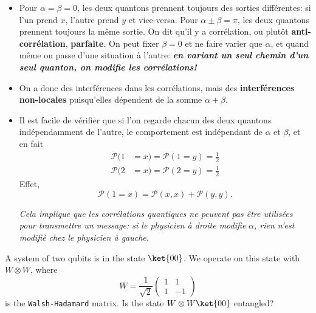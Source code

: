 \begin{itemize}
\item Pour $\alpha=\beta=0$, les deux quantons prennent toujours des sorties
différentes: si l'un prend $x$, l'autre prend $y$ et vice-versa. Pour
$\alpha\pm\beta=\pi$, les deux quantons prennent toujours la même
sortie. On dit qu'il y a corrélation, ou plutôt \textbf{anti-corrélation},
\textbf{parfaite}. On peut fixer $\beta=0$ et ne faire varier que $\alpha$, et
quand même on passe d'une situation à l'autre: \textbf{\emph{en variant un
seul chemin d'un seul quanton, on modifie les corrélations!}}

\item On a donc des interférences dans les corrélations, mais des
\textbf{interférences non-locales} puisqu'elles dépendent de la somme
$\alpha+\beta$.

\item Il est facile de vérifier que si l'on regarde chacun des deux quantons
indépendamment de l'autre, le comportement est indépendant de $\alpha$ et
$\beta$, et en fait%
\begin{subequations}
\begin{align}
\mathcal{P}(1  &  =x)=\mathcal{P}(1=y)=\frac{1}{2}\\
\mathcal{P}(2  &  =x)=\mathcal{P}(2=y)=\frac{1}{2}%
\end{align}%
\end{subequations}%
Effet,%
\begin{equation}
\mathcal{P}(1=x)=\mathcal{P}(x,x)+\mathcal{P}(y,y).
\end{equation}

\medskip\colorbox[gray]{0.8}{
\parbox[c]{0.9\textwidth}{
\emph{Cela implique que les corrélations quantiques ne peuvent pas être
utilisées pour transmettre un message: si le physicien à droite modifie
}$\alpha$\emph{, rien n'est modifié chez le physicien à gauche.}
}}
\end{itemize}

\begin{exercise}
A system of two qubits is in the state $\ket{00}$. We operate on this state with
$W\otimes W$, where
\begin{equation}
W=\frac{1}{\sqrt{2}}
\begin{pmatrix}
1 & 1\\
1 & -1
\end{pmatrix}
\end{equation}
is the \texttt{Walsh-Hadamard} matrix. Is the state $W\otimes W\ket{00}$
entangled?
\end{exercise}

